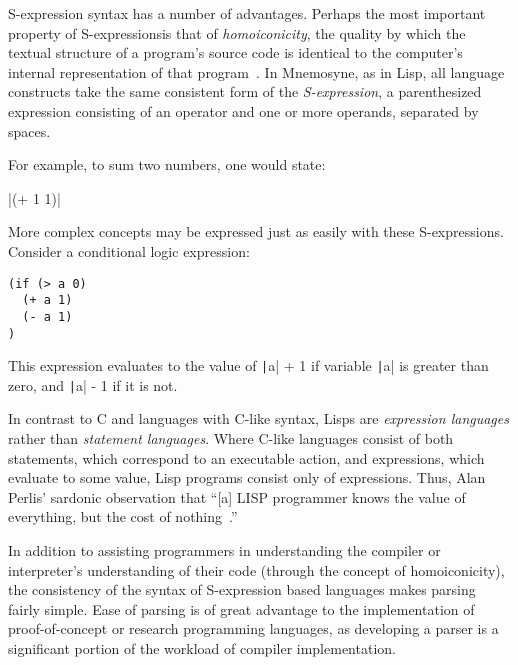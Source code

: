 S-expression syntax has a number of advantages. Perhaps the most important property of S-expressionsis that of \textit{homoiconicity}, the quality by which the textual structure of a program's source code is identical to the computer's internal representation of that program~\cite{vanderhart2010macros,sicp}. In Mnemosyne, as in Lisp, all language constructs take the same consistent form of the \textit{S-expression}, a parenthesized expression consisting of an operator and one or more operands, separated by spaces.

For example, to sum two numbers, one would state:
\FloatBarrier
\begin{centered}
    |(+ 1 1)|
\end{centered}
\FloatBarrier
More complex concepts may be expressed just as easily with these S-expressions. Consider a conditional logic expression:
\FloatBarrier
    \begin{centered}
\begin{verbatim}
(if (> a 0)
  (+ a 1)
  (- a 1)
)
\end{verbatim}
\end{centered}
\FloatBarrier
This expression evaluates to the value of \texttt|a| + 1 if variable \texttt|a| is greater than zero, and \texttt|a| - 1 if it is not.

In contrast to C and languages with C-like syntax, Lisps are \textit{expression languages} rather than \textit{statement languages}. Where C-like languages consist of both statements, which correspond to an executable action, and expressions, which evaluate to some value, Lisp programs consist only of expressions. Thus, Alan Perlis' sardonic observation that ``[a] LISP programmer knows the value of everything, but the cost of nothing~\cite{Perlis:1982:SFE:947955.1083808}.''

In addition to assisting programmers in understanding the compiler or interpreter's understanding of their code (through the concept of homoiconicity), the consistency of the syntax of S-expression based languages makes parsing fairly simple. Ease of parsing is of great advantage to the implementation of proof-of-concept or research programming languages, as developing a parser is a significant portion of the workload of compiler implementation.

